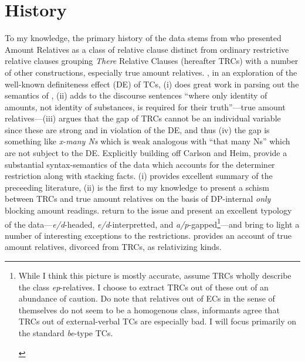 \documentclass[11pt]{article}
\begin{document}
\section{History}
To my knowledge, the primary history of the data stems from \citet{carlsonAmountRelatives1977} who presented Amount Relatives as a class of relative clause distinct from ordinary restrictive relative clauses grouping \textit{There} Relative Clauses (hereafter TRCs) with a number of other constructions, especially true amount relatives.
\citet{heimWhereDoesDefiniteness1987}, in an exploration of the well-known definiteness effect (DE) of TCs, (i) does great work in parsing out the semantics of \citet{carlsonAmountRelatives1977}, (ii) adds to the discourse sentences ``where only identity of amounts, not identity of substances, is required for their truth''---true amount relatives---(iii) argues that the gap of TRCs cannot be an individual variable since these are strong and in violation of the DE, and thus (iv) the gap is something like \textit{x-many Ns} which is weak analogous with ``that many Ns'' which are not subject to the DE. Explicitly building off Carlson and Heim, \citet{grosuStrangeRelativesThird1998} provide a substantial syntax-semantics of the data which accounts for the determiner restriction along with stacking facts.
\citet{mcnallyDPInternalOnlyAmount2008} (i) provides excellent summary of the preceeding literature, (ii) is the first to my knowledge to present a schism between TRCs and true amount relatives on the basis of DP-internal \textit{only} blocking amount readings.
\citet{grosuAmountRelatives2017} return to the issue and present an excellent typology of the data---\textit{e/d}-headed, \textit{e/d}-interpretted, and \textit{a/p}-gapped\footnote{\label{fn:external-TRCs}While I think this picture is mostly accurate, \citet{grosuAmountRelatives2017} assume TRCs wholly describe the class \textit{ep}-relatives. I choose to extract TRCs out of these out of an abundance of caution. Do note that relatives out of ECs in the sense of \citet{milsarkExistentialSentencesEnglish1974} themselves do not seem to be a homogenous class, informants agree that TRCs out of external-verbal TCs are especially bad. I will focus primarily on the standard \textit{be}-type TCs.
	\begin{exe}
	\end{exe}}---and bring to light a number of interesting exceptions to the restrictions.
\citet{mendiaAmountRelativesRedux} provides an account of true amount relatives, divorced from TRCs, as relativizing kinds.
\end{document}
